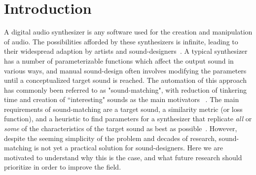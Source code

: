 \section{Introduction}


A digital audio synthesizer is any software used for the creation and manipulation of audio. The possibilities afforded by these synthesizers is infinite, leading to their widespread adaption by artists and sound-designers~\cite{lyons1997understanding,russ1999sound,stranneby2004digital}. A typical synthesizer has a number of parameterizable functions which affect the output sound in various ways, and manual sound-design often involves modifying the parameters until a conceptualized target sound is reached. The automation of this approach has commonly been referred to as "sound-matching", with reduction of tinkering time and creation of ``interesting" sounds as the main motivators ~\cite{krekovic2019insights,turian2020sorry,horner1993machine,salimi2020make,esling2019flow,engel2020ddsp,mitchell2007evolutionary,shier2020spiegelib,masuda2021soundmatch,masuda2023improving}. The main requirements of sound-matching are a target sound, a similarity metric (or loss function), and a heuristic to find parameters for a synthesizer that replicate \textit{all} or \textit{some} of the characteristics of the target sound as best as possible~\cite{horner1993machine,mitchell2007evolutionary,masuda2023improving}. However, despite the seeming simplicity of the problem and decades of research, sound-matching is not yet a practical solution for sound-designers. Here we are motivated to understand why this is the case, and what future research should prioritize in order to improve the field. 

